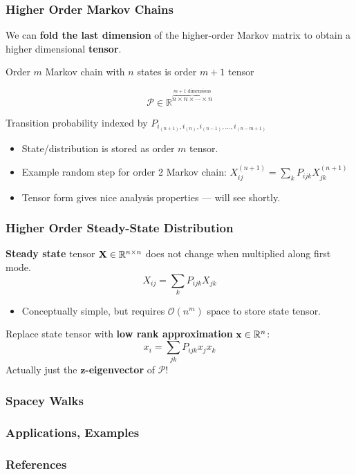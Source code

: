 \documentclass{beamer}
\begin{document}
\begin{frame}
\frametitle{Higher Order Markov Chains}

We can \textbf{fold the last dimension} of the higher-order Markov matrix to obtain a higher dimensional \textbf{tensor}.

\begin{block}{}
Order $m$ Markov chain with $n$ states is order $m+1$ tensor 

\[\mathcal{P} \in \mathbb{R}^{\overbrace{n\times n\times \cdots \times n}^{m+1\text{ dimensions}}}\]

Transition probability indexed by $P_{i_{(n+1)},i_{(n)},i_{(n-1)},\ldots,i_{(n-m+1)}}$
\end{block}

\begin{itemize}
\item State/distribution is stored as order $m$ tensor.
\item Example random step for order 2 Markov chain: $X^{(n+1)}_{ij} = \sum_k P_{ijk} X^{(n+1)}_{jk}$
\item Tensor form gives nice analysis properties --- will see shortly.
\end{itemize}
	
\end{frame}

\begin{frame}
\frametitle{Higher Order Steady-State Distribution}

\begin{block}{}
\textbf{Steady state} tensor ${\bf X} \in \mathbb{R}^{n \times n}$ does not change when multiplied along first mode.
\[ X_{ij} = \sum_k P_{ijk} X_{jk} \]
\end{block}
\begin{itemize}	
\item Conceptually simple, but requires $\mathcal{O}\left(n^m\right)$ space to store state tensor.
\end{itemize}
\begin{block}{}
Replace state tensor with \textbf{low rank approximation} ${\bf x} \in \mathbb{R}^n$:
\[ x_i = \sum_{jk} P_{ijk} x_j x_k \]
Actually just the \textbf{$\boldsymbol{z}$-eigenvector} of $\mathcal{P}$!
\end{block}

\end{frame}

\begin{frame}	
\frametitle{Spacey Walks}
\end{frame}

\begin{frame}
\frametitle{Applications, Examples}
\end{frame}

\begin{frame}
\frametitle{References}
\nocite*{}


\end{frame}
\end{document}
